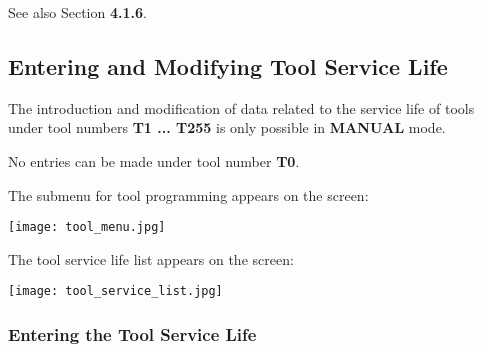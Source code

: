See also Section \textbf{4.1.6}.

\newpage

\subsection{Entering and Modifying Tool Service Life}

The introduction and modification of data related to the service life of tools under tool numbers \textbf{T1 ... T255} is only possible in \textbf{MANUAL} mode.

No entries can be made under tool number \textbf{T0}.

\procedure

\begin{itemize}
    \vspace{.6cm}
    \vspace{.6cm}
\end{itemize}

\vspace{.5cm}

The submenu for tool programming appears on the screen:

\begin{center}
    \texttt{[image: tool\_menu.jpg]}
\end{center}

\begin{itemize}
\end{itemize}

\newpage

The tool service life list appears on the screen:

\begin{center}
    \texttt{[image: tool\_service\_list.jpg]}
\end{center}

\subsubsection*{Entering the Tool Service Life}

